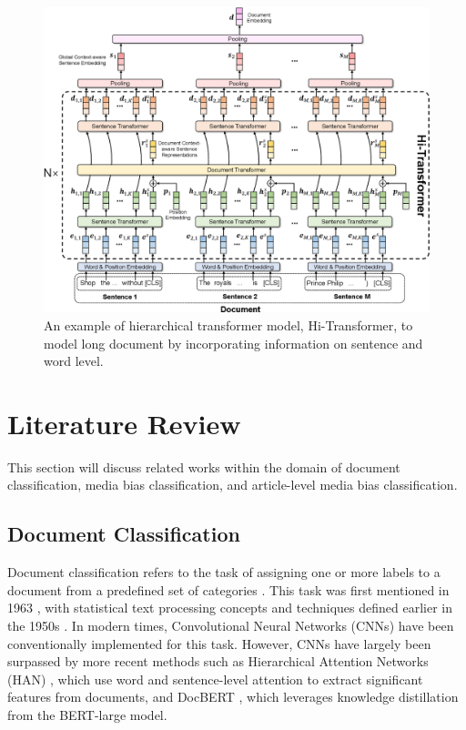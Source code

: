 \begin{figure}[htbp]
    \centering
    \includegraphics[width=0.9\linewidth]{images/hi_transformer.png}
    \caption{An example of hierarchical transformer model, Hi-Transformer\cite{wu-2021-hi-transformer}, to model long document by incorporating information on sentence and word level.}
    \label{fig:hi_transformer}
\end{figure}

\section{Literature Review}

This section will discuss related works within the domain of document classification, media bias classification, and article-level media bias classification.

\subsection{Document Classification}

Document classification refers to the task of assigning one or more labels to a document from a predefined set of categories \cite{wan-2019-long-length}. This task was first mentioned in 1963 \cite{borko-1963-auto-doc-classification}, with statistical text processing concepts and techniques defined earlier in the 1950s \cite{luhn-1958-business-intelligence-system}. In modern times, Convolutional Neural Networks (CNNs) \cite{afzal-deepdocclassifier,liu-2017-xmlcnn} have been conventionally implemented for this task. However, CNNs have largely been surpassed by more recent methods such as Hierarchical Attention Networks (HAN) \cite{yang-2016-han}, which use word and sentence-level attention to extract significant features from documents, and DocBERT \cite{adhikari-2019-docbert}, which leverages knowledge distillation from the BERT-large model.

